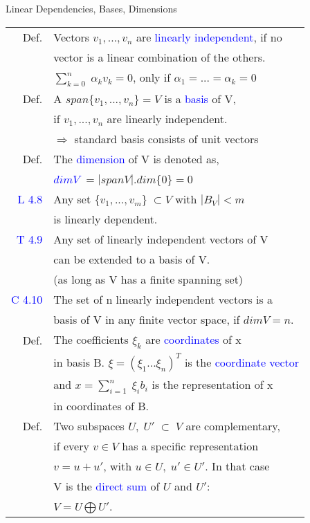 \begin{mainbox}{Linear Dependencies, Bases, Dimensions}
\setlength{\tabcolsep}{2pt}
\begin{tabular}{rl}
	Def. & Vectors $v_1, ..., v_n$ are \textcolor{blue}{linearly independent}, if no\\
	& vector is a linear combination of the others.\\
	& $\displaystyle\sum_{k=0}^{n}\;\alpha_k v_k = 0$, only if $\alpha_1 = ... = \alpha_k = 0$ \\
	\rule{0pt}{3ex} 
	Def. & A $span\{v_1, ..., v_n\} = V$ is a \textcolor{blue}{basis} of V,\\
	& if $v_1, ..., v_n$ are linearly independent.\\ 
	& $\Rightarrow$ standard basis consists of unit vectors\\
	\rule{0pt}{3ex} 
	Def. & The \textcolor{blue}{dimension} of V is denoted as,\\
	& \textcolor{blue}{$dimV$} $=|spanV|$.\quad$dim\{0\} = 0$\\
	\rule{0pt}{3ex} 
	\textcolor{blue}{L 4.8} & Any set $\{v_1, ..., v_m\}\;\subset V$ with $|B_V| < m$ \\
	& is linearly dependent.\\
	\rule{0pt}{3ex} 
	\textcolor{blue}{T 4.9} & Any set of linearly independent vectors of V\\
	& can be extended to a basis of V.\\
	& (as long as V has a finite spanning set)\\
	\rule{0pt}{3ex} 
	\textcolor{blue}{C 4.10} & The set of n linearly independent vectors is a\\
	& basis of V in any finite vector space, if $dimV = n$.\\
	\rule{0pt}{3ex}
	Def. & The coefficients $\xi_k$ are \textcolor{blue}{coordinates} of x\\
	& in basis B. $\xi = (\xi_1 ... \xi_n)^T$ is the \textcolor{blue}{coordinate vector}\\
	& and $x = \displaystyle\sum_{i=1}^n\;\xi_ib_i$ is the representation of x\\
	& in coordinates of B.\\
	\rule{0pt}{3ex}
	Def. & Two subspaces $U,\;U'\;\subset\;V$ are complementary,\\
	& if every $v\in V$ has a specific representation \\
	& $v=u+u'$, with $u\in U,\; u' \in U'$. In that case\\
	& V is the \textcolor{blue}{direct sum} of $U$ and $U'$:\\
	& $V = U \bigoplus U'$.\\
\end{tabular}
\end{mainbox}

